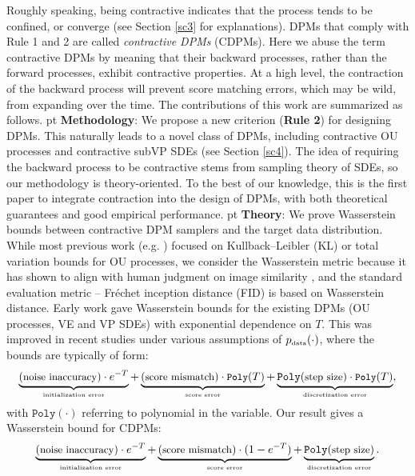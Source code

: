 \documentclass[letterpaper,11pt,reqno]{amsart}
\numberwithin{equation}{section}
\begin{document}
Roughly speaking, being contractive indicates that
the process tends to be confined, or converge (see Section \ref{sc3} for explanations).
DPMs that comply with Rule 1 and 2
are called {\em contractive DPMs} (CDPMs).
Here we abuse the term contractive DPMs by meaning that 
their backward processes, rather than the forward processes, 
exhibit contractive properties.
At a high level, 
the contraction of the backward process will prevent score matching errors,
which may be wild, from expanding over the time.
The contributions of this work are summarized as follows.
 pt
{\bf Methodology}:
We propose a new criterion ({\bf Rule 2}) for designing DPMs.
This naturally leads to a novel class of DPMs,
including contractive OU processes and contractive subVP SDEs (see Section \ref{sc4}).
The idea of requiring the backward process to be contractive
stems from sampling theory of SDEs,
so our methodology is theory-oriented. 
To the best of our knowledge, 
this is the first paper to integrate contraction into the design of DPMs,
with both theoretical guarantees
and good empirical performance.
 pt
{\bf Theory}:
We prove Wasserstein bounds between contractive DPM samplers
and the target data distribution.
While most previous work (e.g. \cite{Chen23, DV21, LLT22}) 
focused on Kullback–Leibler (KL) or total variation bounds for OU processes,
we consider the Wasserstein metric because  
it has shown to align with human judgment on image similarity \cite{Bor19}, and the standard evaluation metric -- Fr\'echet inception distance (FID) is based on Wasserstein distance.
Early work \cite{DV21, KW22} gave Wasserstein bounds for the existing DPMs (OU processes, VE and VP SDEs)
with exponential dependence on $T$.
This was improved in recent studies \cite{Chen23, LLT23, GNZ23}
under various assumptions of $p_{\tiny \mbox{data}}(\cdot)$, 
where the bounds are typically of form:
\begin{equation*}
\underbrace{(\small \mbox{noise inaccuracy}) \cdot e^{-T}}_{\tiny \mbox{initialization error}} + \underbrace{(\small \mbox{score mismatch}) \cdot \texttt{Poly}(T)}_{\tiny \mbox{score error}}
+ \underbrace{\texttt{Poly}(\small \mbox{step size}) \cdot \texttt{Poly}(T)}_{\tiny \mbox{discretization error}},
\end{equation*}
with $\texttt{Poly}(\cdot)$ referring to polynomial in the variable. 
Our result gives a Wasserstein bound for CDPMs:
\begin{equation*}
\underbrace{(\small \mbox{noise inaccuracy}) \cdot e^{-T}}_{\tiny \mbox{initialization error}}  + \underbrace{(\small \mbox{score mismatch}) \cdot (1 - e^{-T})}_{\tiny \mbox{score error}} 
+ \underbrace{\texttt{Poly}(\small \mbox{step size})}_{\tiny \mbox{discretization error}}.
\end{equation*}
\end{document}
